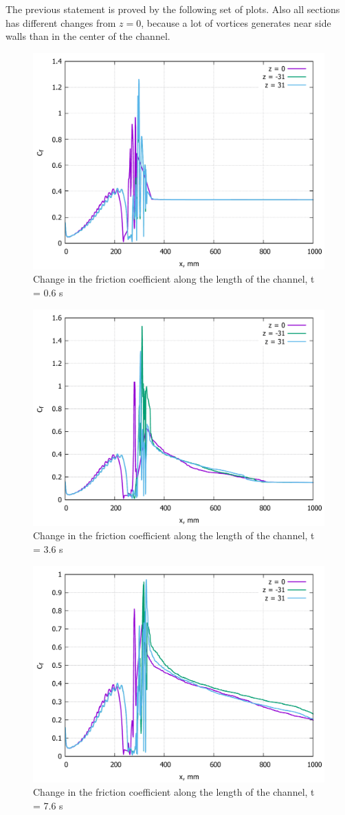 	The previous statement is proved by the following set of plots. Also all sections has different changes from $z = 0$, because a lot of vortices generates near side walls than in the center of the channel.
	\begin{figure}[H]
		\centering
		\includegraphics[width=0.7\linewidth]{../Assets/Cf-T06-all}
		\caption{Change in the friction coefficient along the length of the channel, t = 0.6 s}
		\label{fig:cf-t06-all}
	\end{figure}
	\begin{figure}[H]
		\centering
		\includegraphics[width=0.7\linewidth]{../Assets/Cf-T360-all}
		\caption{Change in the friction coefficient along the length of the channel, t = 3.6 s}
		\label{fig:cf-t360-all}
	\end{figure}
	\begin{figure}[H]
		\centering
		\includegraphics[width=0.7\linewidth]{../Assets/Cf-T760-all}
		\caption{Change in the friction coefficient along the length of the channel, t = 7.6 s}
		\label{fig:cf-t760-all}
	\end{figure}
